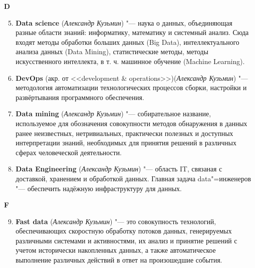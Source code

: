 \begin{flushleft} \large\textbf{D} \end{flushleft}

\begin{enumerate}
    \setcounter{enumi}{4}
    
    \item \textbf{Data science} (\textit{Александр Кузьмин}) "--- 
    наука о данных, объединяющая разные области знаний: информатику, математику и системный анализ. Сюда входят
методы обработки больших данных (Big Data), интеллектуального анализа данных (Data Mining), статистические методы, методы искусственного
интеллекта, в т. ч. машинное обучение (Machine Learning).

    \item \textbf{DevOps} (акр. от <<development \& operations>>)(\textit{Александр Кузьмин}) "--- 
    методология автоматизации технологических процессов сборки, настройки и развёртывания программного обеспечения.

    \item \textbf{Data mining} (\textit{Александр Кузьмин}) "--- 
    собирательное название, используемое для обозначения совокупности методов обнаружения в данных ранее
неизвестных, нетривиальных, практически полезных и доступных интерпретации знаний, необходимых для принятия решений в различных сферах
человеческой деятельности.

\item \textbf{Data Engineering } (\textit{Александр Кузьмин}) "--- 
    область IT, связаная с доставкой, хранением и обработкой данных. Главная задача data"=инженеров "--- обеспечить надёжную инфраструктуру для данных.
    
\end{enumerate}

\begin{flushleft} \large\textbf{F} \end{flushleft}
\begin{enumerate}
    \setcounter{enumi}{8}
    
    \item \textbf{Fast data} (\textit{Александр Кузьмин}) "--- 
    это совокупность технологий, обеспечивающих скоростную обработку потоков данных, генерируемых различными системами и активностями, их анализ и принятие решений с учетом исторически накопленных данных, а также автоматическое выполнение различных действий в ответ на произошедшие события.
    
\end{enumerate}

